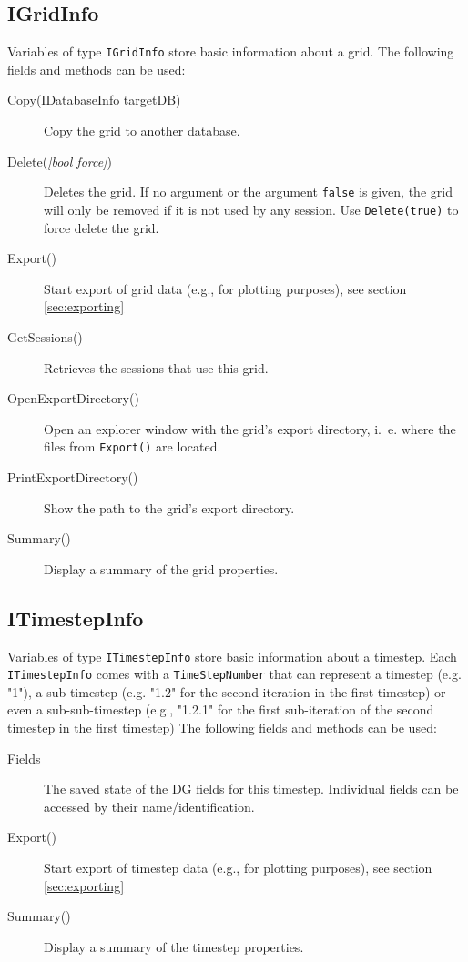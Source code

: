\subsection{IGridInfo}
Variables of type \lstinline{IGridInfo} store basic information about a grid.
The following fields and methods can be used:
\begin{description}
	\item[Copy(IDatabaseInfo targetDB)]
	Copy the grid to another database.
	
	\item[Delete(\emph{{[}bool force{]}})]
	Deletes the grid. If no argument or the argument \lstinline{false} is given, the grid will only be removed if it is not used by any session. Use \lstinline{Delete(true)} to force delete the grid.
	
	\item[Export()]
	Start export of grid data (e.g., for plotting purposes), see section \ref{sec:exporting}
	
	\item[GetSessions()]
	Retrieves the sessions that use this grid.
	
	\item[OpenExportDirectory()]
	Open an explorer window with the grid's export directory, i.~e. where the files from \lstinline{Export()} are located.
	
	\item[PrintExportDirectory()]
	Show the path to the grid's export directory.

	\item[Summary()]
	Display a summary of the grid properties.
\end{description}

\subsection{ITimestepInfo}
\label{sec:ITimestepInfo}
Variables of type \lstinline{ITimestepInfo} store basic information about a timestep. Each \lstinline{ITimestepInfo} comes with a \lstinline{TimeStepNumber} that can represent a timestep (e.g. "1"), a sub-timestep (e.g. "1.2" for the second iteration in the first timestep) or even a sub-sub-timestep (e.g., "1.2.1" for the first sub-iteration of the second timestep in the first timestep)
The following fields and methods can be used:
\begin{description}
	\item[Fields]
	The saved state of the DG fields for this timestep. Individual fields can be accessed by their name/identification.
	
	\item[Export()]
	Start export of timestep data (e.g., for plotting purposes), see section \ref{sec:exporting}
	
	\item[Summary()]
	Display a summary of the timestep properties.
\end{description}


